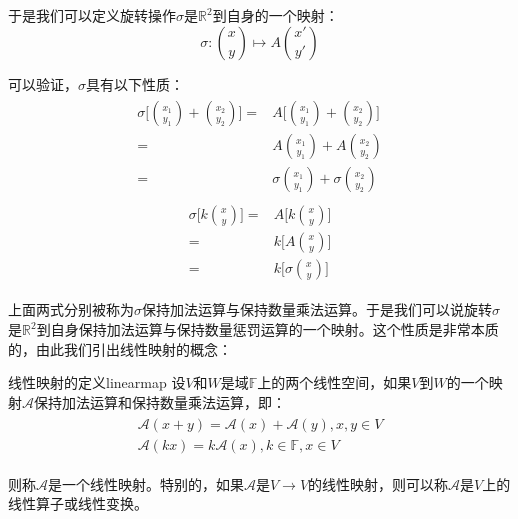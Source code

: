    于是我们可以定义旋转操作$\sigma$是$\mathbb{R}^2$到自身的一个映射：
    \begin{equation}
        \sigma:\binom{x}{y}\mapsto A\binom{x'}{y'}
    \end{equation}
    
    可以验证，$\sigma$具有以下性质：
    \begin{align}
        \begin{split}
            \sigma\Big[\binom{x_1}{y_1}+\binom{x_2}{y_2}\Big]=& A\Big[\binom{x_1}{y_1}+\binom{x_2}{y_2}\Big]\\
            =&  A\binom{x_1}{y_1}+A\binom{x_2}{y_2}\\
            =& \sigma\binom{x_1}{y_1}+\sigma\binom{x_2}{y_2}
        \end{split}
    \end{align}
    \begin{align}
        \begin{split}
            \sigma\Big[k\binom{x}{y}\Big]=&A\Big[k\binom{x}{y}\Big]\\
            =&k\Big[A\binom{x}{y}\Big]\\
            =&k\Big[\sigma\binom{x}{y}\Big]
        \end{split}
    \end{align}
    
    上面两式分别被称为$\sigma$保持加法运算与保持数量乘法运算。于是我们可以说旋转$\sigma$是$\mathbb{R}^2$到自身保持加法运算与保持数量惩罚运算的一个映射。这个性质是非常本质的，由此我们引出线性映射的概念：
    \begin{definition}{线性映射的定义}{linearmap}
        设$V$和$W$是域$\mathbb{F}$上的两个线性空间，如果$V$到$W$的一个映射$\mathscr{A}$保持加法运算和保持数量乘法运算，即：
        \begin{align}
            \begin{split}
                \mathscr{A}(x+y)=\mathscr{A}(x)+\mathscr{A}(y),x,y\in V\\
                \mathscr{A}(kx)=k\mathscr{A}(x),k\in\mathbb{F},x\in V
            \end{split}
        \end{align}
        
        则称$\mathscr{A}$是一个线性映射。特别的，如果$\mathscr{A}$是$V\rightarrow V$的线性映射，则可以称$\mathscr{A}$是$V$上的线性算子或线性变换。
    \end{definition}
    
